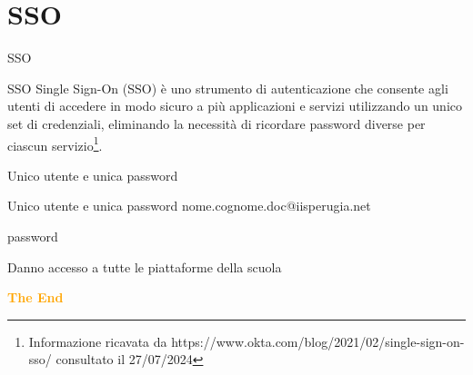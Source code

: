 \documentclass{beamer}
\begin{document}
\section{SSO}
\begin{frame}{SSO}
	\begin{alertblock}{SSO}
	Single Sign-On (SSO) è uno strumento di autenticazione che consente agli utenti di accedere in modo sicuro a più applicazioni e servizi utilizzando un unico set di credenziali, eliminando la necessità di ricordare password diverse per ciascun servizio\footnote{Informazione ricavata da https://www.okta.com/blog/2021/02/single-sign-on-sso/ consultato il 27/07/2024}.
	\end{alertblock}
\end{frame}
\begin{frame}{Unico utente e unica password}
	\begin{alertblock}{Unico utente e unica password}
	nome.cognome.doc@iisperugia.net
	
	password 
	
Danno accesso a tutte le piattaforme della scuola
	\end{alertblock}
\end{frame}
\begin{frame}[ standout ]
\centering
\Huge\bfseries
\textcolor{orange}{The End}
\end{frame}
\end{document}
